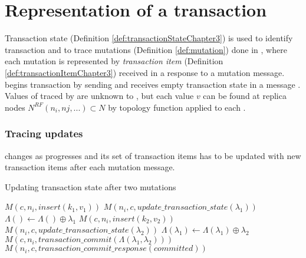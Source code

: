 
\section{Representation of a transaction}


Transaction state (Definition \ref{def:transactionStateChapter3}) is used to identify transaction \transaction and to trace mutations (Definition \ref{def:mutation}) done in \transaction, where each mutation is represented by \emph{transaction item} \txItem (Definition \ref{def:transactionItemChapter3}) received in a response to a mutation message. \client begins transaction by sending \beginTransactionMessage and receives empty transaction state \txState in a message  \initialTxStateMessage.
Values of \mutations traced by \txItems are unknown to \txItems, but each value $v$ can be found at replica nodes $N^{\mathit{RF}}(n_{i},n{j},...)\subset \mathit{N}$ by topology function \topology applied to each \txItem.

\subsubsection{Tracing updates}
\txState changes as \transaction progresses and its set of transaction items has to be updated with new transaction items after each mutation message. 

\begin{algorithm}
  \caption{Updating transaction state after two mutations}
  \label{alg:updateTxState}
  \begin{algorithmic}       
    \State \beginTransactionMessage
    \State \initialTxStateMessage
    \State $\mathit{M}(c, n_{i}, \mathit{insert(k_{1},v_{1})})$
    \State $\mathit{M}(n_{i}, c, \mathit{update\_transaction\_state}(\lambda_{1}))$
    \State $\Lambda() \gets \Lambda() \oplus \lambda_{1}$
    \State $\mathit{M}(c, n_{i}, \mathit{insert(k_{2},v_{2})})$
    \State $\mathit{M}(n_{i}, c, \mathit{update\_transaction\_state}(\lambda_{2}))$
    \State $\Lambda(\lambda_{1}) \gets \Lambda(\lambda_{1}) \oplus \lambda_{2}$
    \State $\mathit{M}(c, n_{i}, \mathit{transaction\_commit}(\Lambda(\lambda_{1}, \lambda_{2})))$
    \State $\mathit{M}(n_{i}, c, \mathit{transaction\_commit\_response}(committed))$    
  \end{algorithmic}
\end{algorithm}


